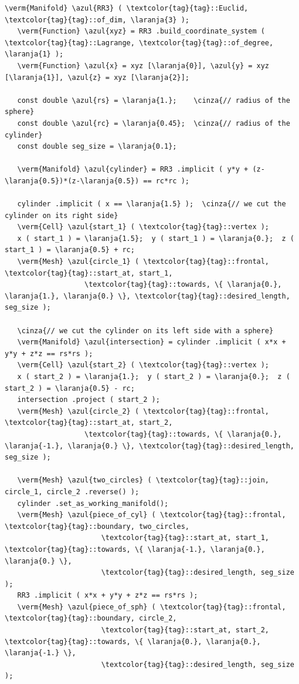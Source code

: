 \begin{Verbatim}[commandchars=\\\{\},formatcom=\small\tt,frame=single,
   label=parag-\ref{\numb section 3.\numb parag 18}.cpp,rulecolor=\color{moldura},
   baselinestretch=0.94,framesep=2mm                                            ]
   \verm{Manifold} \azul{RR3} ( \textcolor{tag}{tag}::Euclid, \textcolor{tag}{tag}::of_dim, \laranja{3} );
   \verm{Function} \azul{xyz} = RR3 .build_coordinate_system ( \textcolor{tag}{tag}::Lagrange, \textcolor{tag}{tag}::of_degree, \laranja{1} );
   \verm{Function} \azul{x} = xyz [\laranja{0}], \azul{y} = xyz [\laranja{1}], \azul{z} = xyz [\laranja{2}];

   const double \azul{rs} = \laranja{1.};    \cinza{// radius of the sphere}
   const double \azul{rc} = \laranja{0.45};  \cinza{// radius of the cylinder}
   const double seg_size = \laranja{0.1};

   \verm{Manifold} \azul{cylinder} = RR3 .implicit ( y*y + (z-\laranja{0.5})*(z-\laranja{0.5}) == rc*rc );

   cylinder .implicit ( x == \laranja{1.5} );  \cinza{// we cut the cylinder on its right side}
   \verm{Cell} \azul{start_1} ( \textcolor{tag}{tag}::vertex );
   x ( start_1 ) = \laranja{1.5};  y ( start_1 ) = \laranja{0.};  z ( start_1 ) = \laranja{0.5} + rc;
   \verm{Mesh} \azul{circle_1} ( \textcolor{tag}{tag}::frontal, \textcolor{tag}{tag}::start_at, start_1,
                   \textcolor{tag}{tag}::towards, \{ \laranja{0.}, \laranja{1.}, \laranja{0.} \}, \textcolor{tag}{tag}::desired_length, seg_size );

   \cinza{// we cut the cylinder on its left side with a sphere}
   \verm{Manifold} \azul{intersection} = cylinder .implicit ( x*x + y*y + z*z == rs*rs );
   \verm{Cell} \azul{start_2} ( \textcolor{tag}{tag}::vertex );
   x ( start_2 ) = \laranja{1.};  y ( start_2 ) = \laranja{0.};  z ( start_2 ) = \laranja{0.5} - rc;
   intersection .project ( start_2 );
   \verm{Mesh} \azul{circle_2} ( \textcolor{tag}{tag}::frontal, \textcolor{tag}{tag}::start_at, start_2,
                   \textcolor{tag}{tag}::towards, \{ \laranja{0.}, \laranja{-1.}, \laranja{0.} \}, \textcolor{tag}{tag}::desired_length, seg_size );

   \verm{Mesh} \azul{two_circles} ( \textcolor{tag}{tag}::join, circle_1, circle_2 .reverse() );
   cylinder .set_as_working_manifold();
   \verm{Mesh} \azul{piece_of_cyl} ( \textcolor{tag}{tag}::frontal, \textcolor{tag}{tag}::boundary, two_circles,
                       \textcolor{tag}{tag}::start_at, start_1, \textcolor{tag}{tag}::towards, \{ \laranja{-1.}, \laranja{0.}, \laranja{0.} \},
                       \textcolor{tag}{tag}::desired_length, seg_size                         );
   RR3 .implicit ( x*x + y*y + z*z == rs*rs );
   \verm{Mesh} \azul{piece_of_sph} ( \textcolor{tag}{tag}::frontal, \textcolor{tag}{tag}::boundary, circle_2,
                       \textcolor{tag}{tag}::start_at, start_2, \textcolor{tag}{tag}::towards, \{ \laranja{0.}, \laranja{0.}, \laranja{-1.} \},
                       \textcolor{tag}{tag}::desired_length, seg_size                         );
                       

\end{Verbatim}
